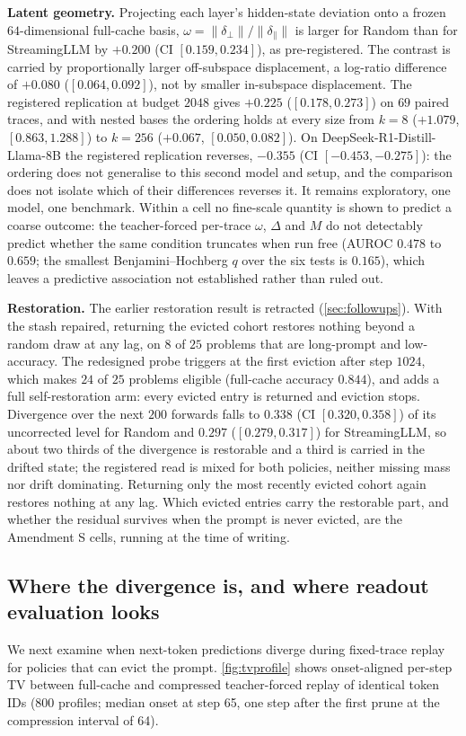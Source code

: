 \documentclass{article}
\begin{document}
\textbf{Latent geometry.} Projecting each layer's hidden-state deviation onto a
frozen $64$-dimensional full-cache basis, $\omega = \|\delta_\perp\|/\|\delta_\parallel\|$
is larger for Random than for StreamingLLM by $+0.200$ (CI $[0.159, 0.234]$), as
pre-registered. The contrast is carried by proportionally larger off-subspace
displacement, a log-ratio difference of $+0.080$ ($[0.064, 0.092]$), not by smaller in-subspace
displacement. The registered replication at budget $2048$ gives $+0.225$
($[0.178, 0.273]$) on $69$ paired traces, and with nested bases the ordering holds
at every size from $k = 8$ ($+1.079$, $[0.863, 1.288]$) to $k = 256$ ($+0.067$,
$[0.050, 0.082]$). On DeepSeek-R1-Distill-Llama-8B the registered replication
reverses, $-0.355$ (CI $[-0.453, -0.275]$): the ordering does not generalise to
this second model and setup, and the comparison does not isolate which of
their differences reverses it. It remains exploratory, one model, one
benchmark. Within a cell no fine-scale quantity is shown to predict a
coarse outcome: the teacher-forced per-trace $\omega$, $\Delta$ and $M$ do not
detectably predict whether the same condition truncates when run free (AUROC
$0.478$ to $0.659$; the smallest Benjamini--Hochberg $q$ over the six tests is
$0.165$), which leaves a predictive association not established rather than
ruled out.

\textbf{Restoration.} The earlier restoration result is retracted
(\cref{sec:followups}). With the stash repaired, returning the evicted cohort
restores nothing beyond a random draw at any lag, on $8$ of $25$ problems that
are long-prompt and low-accuracy. The redesigned probe triggers at the first
eviction after step $1024$, which makes $24$ of $25$ problems eligible
(full-cache accuracy $0.844$), and adds a full self-restoration arm: every
evicted entry is returned and eviction stops. Divergence over the next $200$
forwards falls to $0.338$ (CI $[0.320, 0.358]$) of its uncorrected level for
Random and $0.297$ ($[0.279, 0.317]$) for StreamingLLM, so about two thirds of
the divergence is restorable and a third is carried in the drifted state; the
registered read is mixed for both policies, neither missing mass nor drift
dominating. Returning only the most recently evicted cohort again restores
nothing at any lag. Which evicted entries carry the restorable part, and
whether the residual survives when the prompt is never evicted, are the
Amendment S cells, running at the time of writing.
\fi

\subsection{Where the divergence is, and where readout evaluation looks}
\label{sec:mechanism}
We next examine when next-token predictions diverge during fixed-trace replay for policies that can evict the prompt. \cref{fig:tvprofile} shows onset-aligned per-step TV between full-cache and compressed teacher-forced replay of identical token IDs (800 profiles; median onset at step 65, one step after the first prune at the compression interval of 64).
\end{document}
